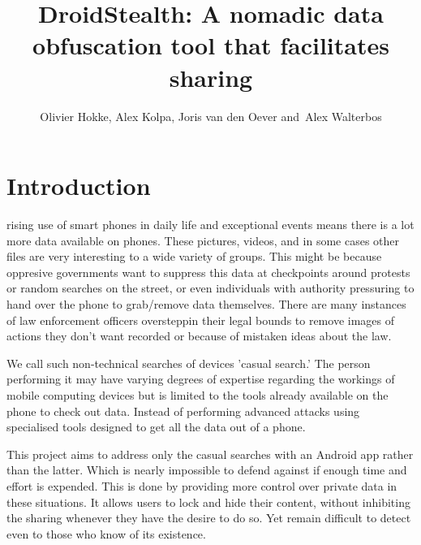\documentclass[twocolumn,english,compsoc,journal]{IEEEtran}
\begin{document}
\title{DroidStealth: A nomadic data obfuscation tool that facilitates sharing}


\author{Olivier Hokke, Alex Kolpa, Joris van den Oever and~Alex Walterbos}




\maketitle

\IEEEdisplaynontitleabstractindextext{}


\IEEEpeerreviewmaketitle{}


\section{Introduction}

 rising use of smart phones in daily life and
exceptional events means there is a lot more data available on phones.
These pictures, videos, and in some cases other files are very interesting
to a wide variety of groups. This might be because oppresive governments
want to suppress this data at checkpoints around protests or random
searches on the street, or even individuals with authority pressuring
to hand over the phone to grab/remove data themselves. There are many
instances of law enforcement officers oversteppin their legal bounds
to remove images of actions they don't want recorded or because of
mistaken ideas about the law. 

We call such non-technical searches of devices 'casual search.' The
person performing it may have varying degrees of expertise regarding
the workings of mobile computing devices but is limited to the tools
already available on the phone to check out data. Instead of performing
advanced attacks using specialised tools designed to get all the data
out of a phone. 

This project aims to address only the casual searches with an Android
app rather than the latter. Which is nearly impossible to defend against
if enough time and effort is expended. This is done by providing more
control over private data in these situations. It allows users to
lock and hide their content, without inhibiting the sharing whenever
they have the desire to do so. Yet remain difficult to detect even
to those who know of its existence.
\end{document}

